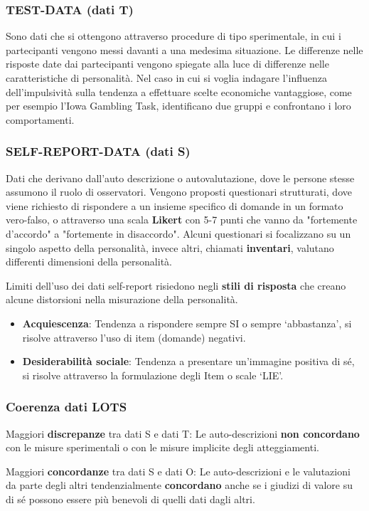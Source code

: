 \documentclass{subfiles}
\begin{document}
\subsubsection{TEST-DATA (dati T)}
Sono dati che si ottengono attraverso procedure di tipo sperimentale, in cui i partecipanti 
vengono messi davanti a una medesima situazione. 
Le differenze nelle risposte date dai partecipanti vengono spiegate alla luce di differenze 
nelle caratteristiche di personalità.
Nel caso in cui si voglia indagare l'influenza dell'impulsività sulla tendenza a effettuare 
scelte economiche vantaggiose, come per esempio l'Iowa Gambling Task, identificano due gruppi 
e confrontano i loro comportamenti.

\subsubsection{SELF-REPORT-DATA (dati S)}
Dati che derivano dall'auto descrizione o autovalutazione, dove le persone stesse assumono il 
ruolo di osservatori.
Vengono proposti questionari strutturati, dove viene richiesto di rispondere a un insieme 
specifico di domande in un formato vero-falso, o attraverso una scala \textbf{Likert} con 5-7 punti che vanno da "fortemente d'accordo" a "fortemente in disaccordo".
Alcuni questionari si focalizzano su un singolo aspetto della personalità, invece altri, 
chiamati \textbf{inventari}, valutano differenti dimensioni della personalità.

Limiti dell'uso dei dati self-report risiedono negli \textbf{stili di risposta} che creano alcune distorsioni nella misurazione della personalità.
\begin{itemize}
    \item \textbf{Acquiescenza}: Tendenza a rispondere sempre SI o sempre `abbastanza', 
    si risolve attraverso l'uso di item (domande) negativi.
    \item \textbf{Desiderabilità sociale}: Tendenza a presentare un'immagine positiva di sé, 
    si risolve attraverso la formulazione degli Item o scale `LIE'. 
\end{itemize}

\subsubsection{Coerenza dati LOTS}

Maggiori \textbf{discrepanze} tra dati S e dati T: Le auto-descrizioni \textbf{non concordano} 
con le misure sperimentali o con le misure implicite degli atteggiamenti.

Maggiori \textbf{concordanze} tra dati S e dati O: Le auto-descrizioni e le valutazioni da 
parte degli altri tendenzialmente \textbf{concordano} anche se i giudizi di valore su di sé 
possono essere più benevoli di quelli dati dagli altri. 

\vspace{2cm}
\end{document}
